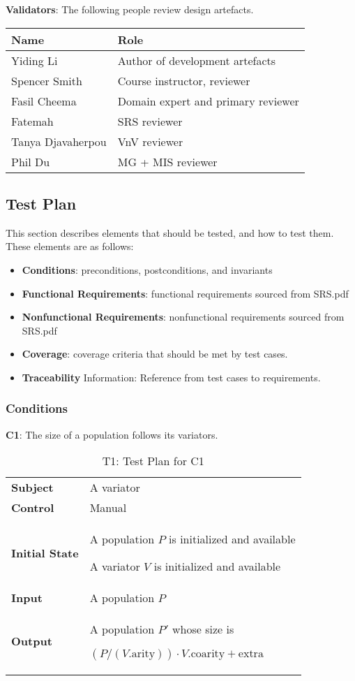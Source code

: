 \documentclass[12pt, titlepage]{article}
\begin{document}
\textbf{Validators}: The following people review design artefacts.

\begin{tabularx}{\textwidth}{p{3cm}X}
  \toprule {\bf Name} & {\bf Role}\\
  \midrule
  Yiding Li&Author of development artefacts\\
  Spencer Smith&Course instructor,  reviewer\\
  Fasil Cheema&Domain expert and primary  reviewer\\
  Fatemah&SRS reviewer\\
  Tanya Djavaherpou&VnV reviewer\\
  Phil Du&MG + MIS reviewer\\
  \bottomrule
\end{tabularx}

\subsection{Test Plan}
This section describes elements that should be tested, and how to test them. These elements are as follows:
\begin{itemize}
  \item \textbf{Conditions}: preconditions, postconditions, and invariants
  \item \textbf{Functional Requirements}: functional requirements sourced from SRS.pdf
  \item \textbf{Nonfunctional Requirements}: nonfunctional requirements sourced from SRS.pdf
  \item \textbf{Coverage}: coverage criteria that should be met by test cases.
  \item \textbf{Traceability} Information: Reference from test cases to requirements.
\end{itemize}

\subsubsection{Conditions}
\textbf{C1}: The size of a population follows its variators.

\begin{table}[!ht]
  \caption{T1: Test Plan for C1}
  \label{table:t1}
  \begin{tabularx}{\textwidth}{p{3cm}X}
    \toprule
    {\bf Subject} & A variator\\
    {\bf Control} & Manual\\
    {\bf Initial State} & A population $P$ is initialized and available

    A variator $V$ is initialized and available\\
    {\bf Input} & A population $P$\\
    {\bf Output} & A population $P'$ whose size is

    $(P/(V.\mathrm{arity}))\cdot V.\mathrm{coarity}+\mathrm{extra}$\\

    \bottomrule
  \end{tabularx}
\end{table}
\end{document}
